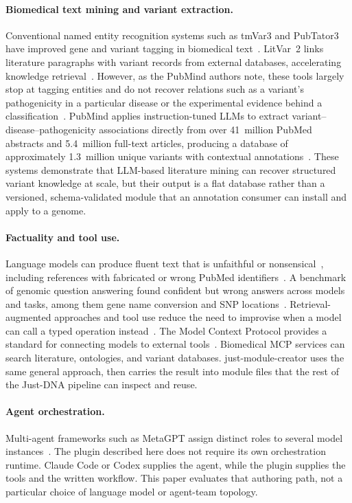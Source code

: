 \documentclass[11pt,a4paper]{article}
\begin{document}
\paragraph{Biomedical text mining and variant extraction.}
Conventional named entity recognition systems such as tmVar3 and PubTator3
have improved gene and variant tagging in biomedical
text~\citep{wei2022tmvar3,wei2024pubtator3}. LitVar~2 links literature
paragraphs with variant records from external databases, accelerating
knowledge retrieval~\citep{allot2023litvar2}. However, as the PubMind authors
note, these tools largely stop at tagging entities and do not recover relations
such as a variant's pathogenicity in a particular disease or the experimental
evidence behind a classification~\citep{wang2026pubmind}. PubMind applies
instruction-tuned LLMs to extract variant--disease--pathogenicity associations
directly from over 41~million PubMed abstracts and 5.4~million full-text
articles, producing a database of approximately 1.3~million unique variants
with contextual annotations~\citep{wang2026pubmind}. These systems demonstrate
that LLM-based literature mining can recover structured variant knowledge at
scale, but their output is a flat database rather than a versioned,
schema-validated module that an annotation consumer can install and apply to a
genome.

\paragraph{Factuality and tool use.}
Language models can produce fluent text that is unfaithful or
nonsensical~\citep{ji2023survey}, including references with fabricated or wrong
PubMed identifiers~\citep{bhattacharyya2023high}. A benchmark of genomic
question answering found confident but wrong answers across models and tasks,
among them gene name conversion and SNP locations~\citep{shang2025geneturing}. Retrieval-augmented approaches and
tool use reduce the need to improvise when a model can call a typed operation
instead~\citep{schick2023toolformer,jin2024genegpt}. The Model Context Protocol
provides a standard for connecting models to external
tools~\citep{anthropic2024mcp}. Biomedical MCP services can search literature,
ontologies, and variant databases. just-module-creator uses the same general
approach, then carries the result into module files that the rest of the
Just-DNA pipeline can inspect and reuse.

\paragraph{Agent orchestration.}
Multi-agent frameworks such as MetaGPT assign distinct roles to several model
instances~\citep{hong2023metagpt}. The plugin described here does not require
its own orchestration runtime. Claude Code or Codex supplies the agent, while
the plugin supplies the tools and the written workflow. This paper evaluates
that authoring path, not a particular choice of language model or agent-team
topology.
\end{document}
